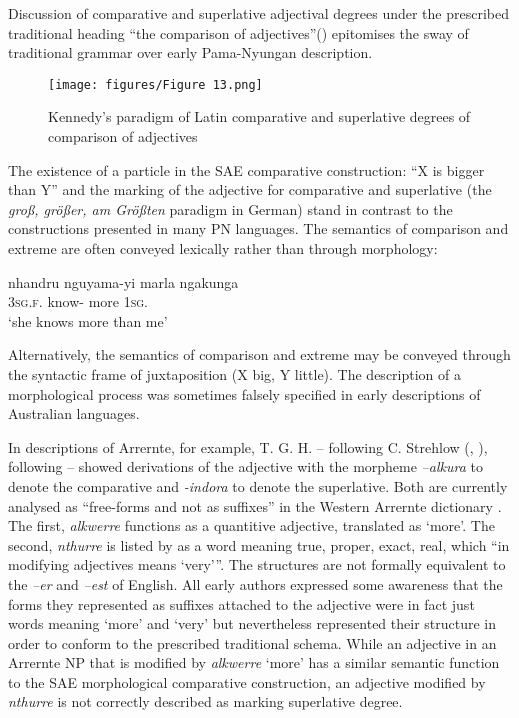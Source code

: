 Discussion of comparative and superlative adjectival degrees under the prescribed traditional heading “the comparison of adjectives”() epitomises the sway of traditional grammar over early Pama-Nyungan description.

\begin{figure}
\texttt{[image: figures/Figure 13.png]}
\caption{Kennedy’s paradigm of Latin comparative and superlative degrees of comparison of adjectives \citep[132]{kennedy_public_1879}}
\label{fig:key:2-13}
\end{figure}

The existence of a particle in the SAE comparative construction: “X is bigger than Y” and the marking of the adjective for comparative and superlative (the \textit{groß, größer, am Größten} paradigm in German) \citep[1499, 1501--1502]{haspelmath_european_2001} stand in contrast to the constructions presented in many PN languages. The semantics of comparison and extreme are often conveyed lexically rather than through morphology: 

\ea
\gll nhandru nguyama-yi marla ngakunga \\
3\textsc{sg}.\textsc{f}. know- more 1\textsc{sg}.\\
\glt `she knows more than me' \\
\citep[112]{austin_grammar_2013}
\z

Alternatively, the semantics of comparison and extreme may be conveyed through the syntactic frame of juxtaposition (X big, Y little). The description of a morphological process was sometimes falsely specified in early descriptions of Australian languages. 

In descriptions of Arrernte, for example, T. G. H. \citet[86--87]{strehlow_aranda_1944} – following C. Strehlow (\citeyear[28--30]{strehlow_untitled_1931}, \citeyear[8]{strehlow_notitle_1910}), following \citet[7]{kempe_grammar_1891} – showed derivations of the adjective with the morpheme \textit{–alkura} to denote the comparative and \textit{-indora} to denote the superlative. Both are currently analysed as ``free-forms and not as suffixes'' in the Western Arrernte dictionary \citep{breen_introductory_2000}. The first, \textit{alkwerre} functions as a quantitive adjective, translated as `more'. The second, \textit{nthurre} is listed by \citet[587]{wilkins_mparntwe_1989} as a word meaning true, proper, exact, real, which “in modifying adjectives means `very'”. The structures are not formally equivalent to the \textit{–er} and \textit{–est} of English. All early authors expressed some awareness that the forms they represented as suffixes attached to the adjective were in fact just words meaning `more' and `very' but nevertheless represented their structure in order to conform to the prescribed traditional schema. While an adjective in an Arrernte NP that is modified by \textit{alkwerre} `more' has a similar semantic function to the SAE morphological comparative construction, an adjective modified by \textit{nthurre} is not correctly described as marking superlative degree.

